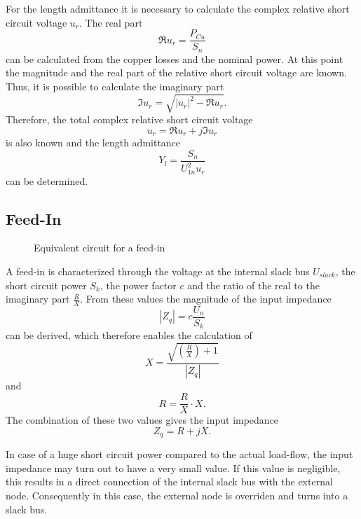 For the length admittance it is necessary to calculate the complex relative short circuit voltage $u_r$. The real part
\begin{equation}
	\Re{u_r} = \frac{P_{Cu}}{S_n}
\end{equation}
can be calculated from the copper losses and the nominal power. At this point the magnitude and the real part of the relative short circuit voltage are known. Thus, it is possible to calculate the imaginary part
\begin{equation}
	\Im{u_r} = \sqrt{|u_r|^2 - \Re{u_r}}.
\end{equation}
Therefore, the total complex relative short circuit voltage
\begin{equation}
	u_r = \Re{u_r} + j \Im{u_r}
\end{equation}
is also known and the length admittance
\begin{equation}
	Y_l = \frac{S_n}{U_{1n}^2 u_r}
\end{equation}
can be determined.

\subsection{Feed-In}

\begin{figure}
	\centering
	
	\caption{Equivalent circuit for a feed-in}
	\label{fig:feedin}
\end{figure}

A feed-in  is characterized through the voltage at the internal slack bus $U_{slack}$, the short circuit power $S_k$, the power factor $c$ and the ratio of the real to the imaginary part $\frac{R}{X}$. From these values the magnitude of the input impedance 
\begin{equation}
	|Z_q| = c \frac{U_n}{S_k}
\end{equation}
can be derived, which therefore enables the calculation of
\begin{equation}
	X = \frac{\sqrt{\left( \frac{R}{X} \right) + 1}}{|Z_q|}
\end{equation}
and
\begin{equation}
	R = \frac{R}{X} \cdot X.
\end{equation}
The combination of these two values gives the input impedance
\begin{equation}
	Z_q = R + j X.
\end{equation}

In case of a huge short circuit power compared to the actual load-flow, the input impedance may turn out to have a very small value. If this value is negligible, this results in a direct connection of the internal slack bus with the external node. Consequently in this case, the external node is overriden and turns into a slack bus.

